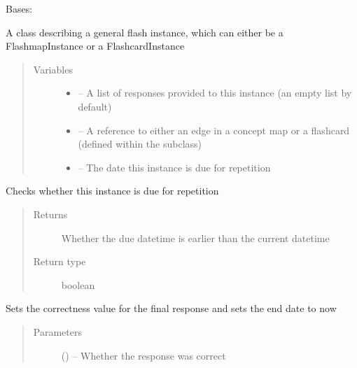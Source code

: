 \documentclass[letterpaper,10pt,english]{sphinxmanual}
\begin{document}
\begin{fulllineitems}
\label{\detokenize{instance:instance.Instance}}
Bases: 

A class describing a general flash instance, which can either be a FlashmapInstance or a FlashcardInstance
\begin{quote}\begin{description}
\item[{Variables}] \leavevmode\begin{itemize}
\item {} 
 -- A list of responses provided to this instance (an empty list by default)

\item {} 
 -- A reference to either an edge in a concept map or a flashcard (defined within the subclass)

\item {} 
 -- The date this instance is due for repetition

\end{itemize}

\end{description}\end{quote}

\begin{fulllineitems}
\label{\detokenize{instance:instance.Instance.check_due}}
Checks whether this instance is due for repetition
\begin{quote}\begin{description}
\item[{Returns}] \leavevmode
Whether the due datetime is earlier than the current datetime

\item[{Return type}] \leavevmode
boolean

\end{description}\end{quote}

\end{fulllineitems}


\begin{fulllineitems}
\label{\detokenize{instance:instance.Instance.finalise_response}}
Sets the correctness value for the final response and sets the end date to now
\begin{quote}\begin{description}
\item[{Parameters}] \leavevmode
{} () -- Whether the response was correct


\end{description}
\end{quote}
\end{fulllineitems}
\end{fulllineitems}
\end{document}
